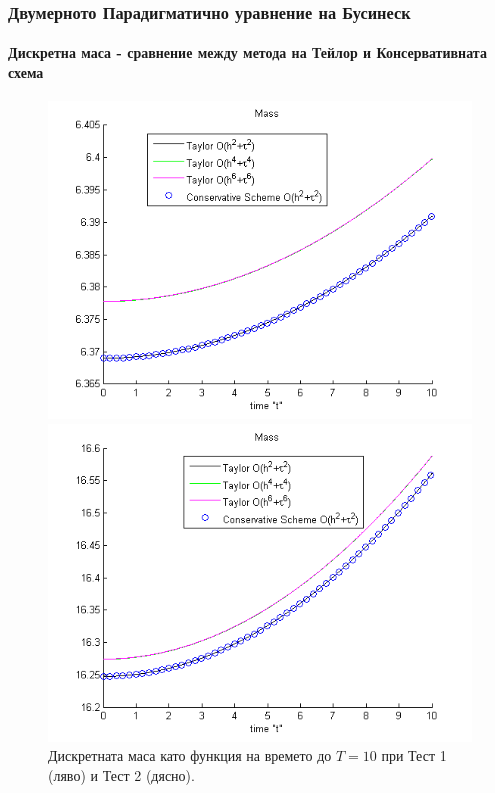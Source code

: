 \documentclass{beamer}
\begin{document}
\begin{frame}
\frametitle{Двумерното Парадигматично уравнение на Бусинеск}
\framesubtitle{Дискретна маса - сравнение между метода на Тейлор и Консервативната схема}

\begin{figure}[ht]\vspace{0.4cm}
	\begin{minipage}[b]{0.49\linewidth}
		 \includegraphics[width=\linewidth]{../amitans/figures/Mass_bt3_c045_h005_Taylor_Conservative.png}
	\end{minipage}	
	\begin{minipage}[b]{0.49\linewidth}
		\includegraphics[width=\linewidth]{../amitans/figures/Mass_bt1_c090_h010_Taylor_Conservative.png}	
	\end{minipage}
\caption{Дискретната маса като функция на времето до $T = 10$ при Тест 1 (ляво) и Тест 2 (дясно).}
\label{Test1En}
\end{figure}

\end{frame}
\end{document}
